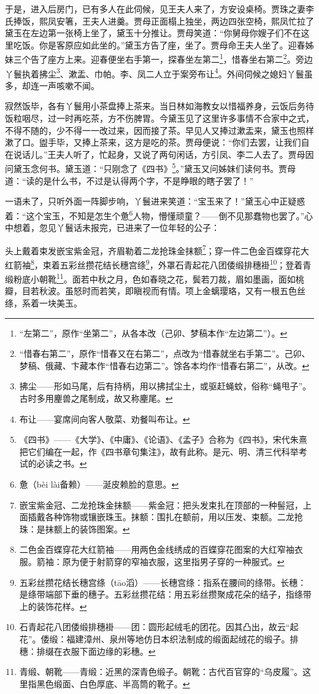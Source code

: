 \par 于是，进入后房门，已有多人在此伺候，见王夫人来了，方安设桌椅。贾珠之妻李氏捧饭，熙凤安箸，王夫人进羹。贾母正面榻上独坐，两边四张空椅，熙凤忙拉了黛玉在左边第一张椅上坐了，黛玉十分推让。贾母笑道：“你舅母你嫂子们不在这里吃饭。你是客原应如此坐的。”黛玉方告了座，坐了。贾母命王夫人坐了。迎春姊妹三个告了座方上来。迎春便坐右手第一，探春坐左第二\footnote{“左第二”，原作“坐第二”，从各本改（己卯、梦稿本作“左边第二”）。}，惜春坐右第二\footnote{“惜春右第二”，原作“惜春又在右第二”，点改为“惜春就坐右手第二”。己卯、梦稿、俄藏、卞藏本作“惜春右边第二”。馀各本均作“惜春右第二”，从改。}。旁边丫鬟执着拂尘\footnote{拂尘——形如马尾，后有持柄，用以拂拭尘土，或驱赶蝇蚊，俗称“蝇甩子”。古时多用麈兽之尾制成，故又称麈尾。}、漱盂、巾帕。李、凤二人立于案旁布让\footnote{布让——宴席间向客人敬菜、劝餐叫布让。}。外间伺候之媳妇丫鬟虽多，却连一声咳嗽不闻。
\par 寂然饭毕，各有丫鬟用小茶盘捧上茶来。当日林如海教女以惜福养身，云饭后务待饭粒咽尽，过一时再吃茶，方不伤脾胃。今黛玉见了这里许多事情不合家中之式，不得不随的，少不得一一改过来，因而接了茶。早见人又捧过漱盂来，黛玉也照样漱了口。盥手毕，又捧上茶来，这方是吃的茶。贾母便说：“你们去罢，让我们自在说话儿。”王夫人听了，忙起身，又说了两句闲话，方引凤、李二人去了。贾母因问黛玉念何书。黛玉道：“只刚念了《四书》\footnote{《四书》——《大学》、《中庸》、《论语》、《孟子》合称为《四书》，宋代朱熹把它们编在一起，作《四书章句集注》，故有此称。是元、明、清三代科举考试的必读之书。}。”黛玉又问姊妹们读何书。贾母道：“读的是什么书，不过是认得两个字，不是睁眼的瞎子罢了！”
\par 一语未了，只听外面一阵脚步响，丫鬟进来笑道：“宝玉来了！”黛玉心中正疑惑着：“这个宝玉，不知是怎生个惫\footnote{惫（bèi lài备赖）——涎皮赖脸的意思。}人物，懵懂顽童？——倒不见那蠢物也罢了。”心中想着，忽见丫鬟话未报完，已进来了一位年轻的公子：
\par 头上戴着束发嵌宝紫金冠，齐眉勒着二龙抢珠金抹额\footnote{嵌宝紫金冠、二龙抢珠金抹额——紫金冠：把头发束扎在顶部的一种髻冠，上面插戴各种饰物或镶嵌珠玉。抹额：围扎在额前，用以压发、束额。二龙抢珠：是抹额上的装饰图案。}；穿一件二色金百蝶穿花大红箭袖\footnote{二色金百蝶穿花大红箭袖——用两色金线绣成的百蝶穿花图案的大红窄袖衣服。箭袖：原为便于射箭穿的窄袖衣服，这里指男子穿的一种服式。}，束着五彩丝攒花结长穗宫绦\footnote{五彩丝攒花结长穗宫绦（tāo滔）——长穗宫绦：指系在腰间的绦带。长穗：是绦带端部下垂的穗子。五彩丝攒花结：用五彩丝攒聚成花朵的结子，指绦带上的装饰花样。}，外罩石青起花八团倭缎排穗褂\footnote{石青起花八团倭缎排穗褂——团：圆形起绒毛的团花。因其凸出，故云“起花”。倭缎：福建漳州、泉州等地仿日本织法制成的缎面起绒花的缎子。排穗：排缀在衣服下面边缘的彩穗。}；登着青缎粉底小朝靴\footnote{青缎、朝靴——青缎：近黑的深青色缎子。朝靴：古代百官穿的“乌皮履”。这里指黑色缎面、白色厚底、半高筒的靴子。}。面若中秋之月，色如春晓之花，鬓若刀裁，眉如墨画，面如桃瓣，目若秋波。虽怒时而若笑，即瞋视而有情。项上金螭璎珞，又有一根五色丝绦，系着一块美玉。

